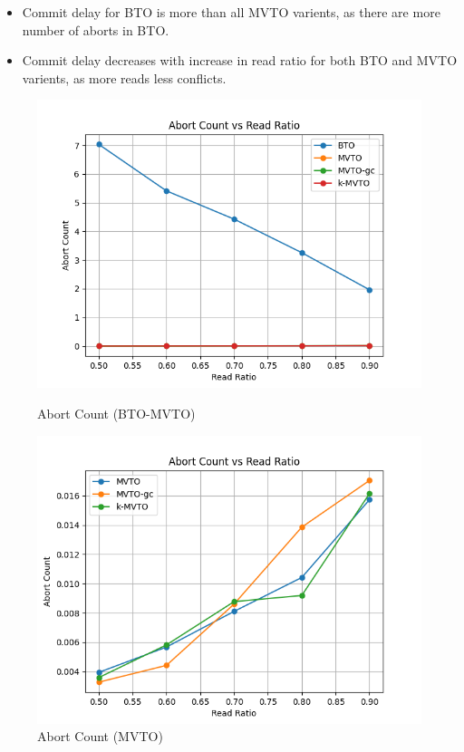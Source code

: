 \documentclass[12pt]{article}
\begin{document}
\begin{itemize}
    \item Commit delay for BTO is more than all MVTO varients, as there are more number of aborts in BTO.
    \item Commit delay decreases with increase in read ratio for both BTO and MVTO varients, as more reads less conflicts.
\end{itemize}
\begin{figure}[h]
    \centering
    \begin{minipage}[b]{0.45\textwidth}
        \includegraphics[width=\textwidth]{./images/ReadRatioAC.png}
        \caption{Abort Count (BTO-MVTO)}
        \label{fig:ReadRatioAC}
    \end{minipage}
    \hfill
    \begin{minipage}[b]{0.45\textwidth}
        \includegraphics[width=\textwidth]{./images/MVTOreadRatioAC.png}
        \caption{Abort Count (MVTO)}
        \label{fig:MVTOreadRatioAC}
    \end{minipage}
\end{figure}
\end{document}
